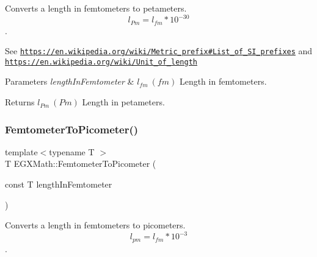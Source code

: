 Converts a length in femtometers to petameters. \[ l_{Pm}=l_{fm} * 10^{-30} \]. 

See \href{https://en.wikipedia.org/wiki/Metric_prefix#List_of_SI_prefixes}{\tt https\+://en.\+wikipedia.\+org/wiki/\+Metric\+\_\+prefix\#\+List\+\_\+of\+\_\+\+S\+I\+\_\+prefixes} and \href{https://en.wikipedia.org/wiki/Unit_of_length}{\tt https\+://en.\+wikipedia.\+org/wiki/\+Unit\+\_\+of\+\_\+length} 
\begin{DoxyParams}{Parameters}
{\em length\+In\+Femtometer} & $ l_{fm}\ (fm)$ Length in femtometers. \\
\hline
\end{DoxyParams}
\begin{DoxyReturn}{Returns}
$ l_{Pm}\ (Pm)$ Length in petameters. 
\end{DoxyReturn}
\mbox{\label{group___e_g_x_math-_conversions-_length_conversions-_s_i-_femtometer-_s_i_gadfcd6b374d4134cad0ac1ce7a8e50509}} 
\subsubsection{\texorpdfstring{Femtometer\+To\+Picometer()}{FemtometerToPicometer()}}
{\footnotesize\ttfamily template$<$typename T $>$ \\
T E\+G\+X\+Math\+::\+Femtometer\+To\+Picometer (\begin{DoxyParamCaption}\item[{const T}]{length\+In\+Femtometer }\end{DoxyParamCaption})}



Converts a length in femtometers to picometers. \[ l_{pm}=l_{fm} * 10^{-3} \]. 

